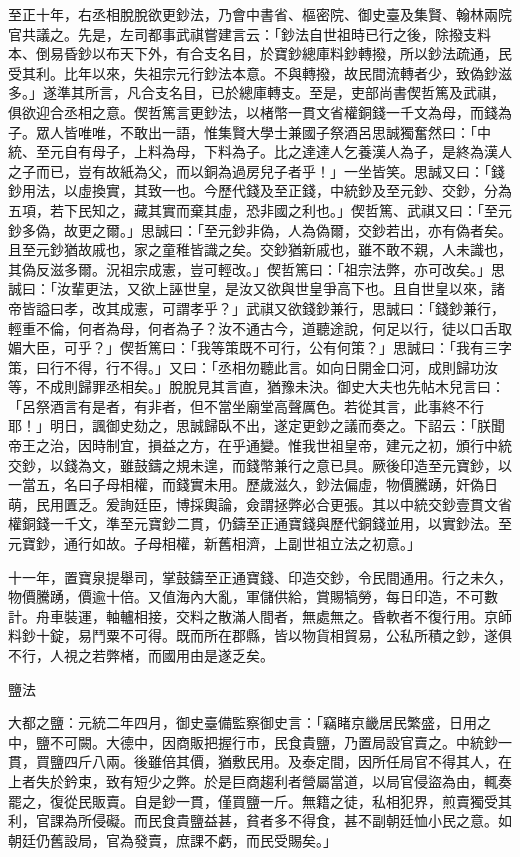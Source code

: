\begin{pinyinscope}
 至正十年，右丞相脫脫欲更鈔法，乃會中書省、樞密院、御史臺及集賢、翰林兩院官共議之。先是，左司都事武祺嘗建言云：「鈔法自世祖時已行之後，除撥支料本、倒易昏鈔以布天下外，有合支名目，於寶鈔總庫料鈔轉撥，所以鈔法疏通，民受其利。比年以來，失祖宗元行鈔法本意。不與轉撥，故民間流轉者少，致偽鈔滋多。」遂準其所言，凡合支名目，已於總庫轉支。至是，吏部尚書偰哲篤及武祺，俱欲迎合丞相之意。偰哲篤言更鈔法，以楮幣一貫文省權銅錢一千文為母，而錢為子。眾人皆唯唯，不敢出一語，惟集賢大學士兼國子祭酒呂思誠獨奮然曰：「中統、至元自有母子，上料為母，下料為子。比之達達人乞養漢人為子，是終為漢人之子而已，豈有故紙為父，而以銅為過房兒子者乎！」一坐皆笑。思誠又曰：「錢鈔用法，以虛換實，其致一也。今歷代錢及至正錢，中統鈔及至元鈔、交鈔，分為五項，若下民知之，藏其實而棄其虛，恐非國之利也。」偰哲篤、武祺又曰：「至元鈔多偽，故更之爾。」思誠曰：「至元鈔非偽，人為偽爾，交鈔若出，亦有偽者矣。且至元鈔猶故戚也，家之童稚皆識之矣。交鈔猶新戚也，雖不敢不親，人未識也，其偽反滋多爾。況祖宗成憲，豈可輕改。」偰哲篤曰：「祖宗法弊，亦可改矣。」思誠曰：「汝輩更法，又欲上誣世皇，是汝又欲與世皇爭高下也。且自世皇以來，諸帝皆謚曰孝，改其成憲，可謂孝乎？」武祺又欲錢鈔兼行，思誠曰：「錢鈔兼行，輕重不倫，何者為母，何者為子？汝不通古今，道聽途說，何足以行，徒以口舌取媚大臣，可乎？」偰哲篤曰：「我等策既不可行，公有何策？」思誠曰：「我有三字策，曰行不得，行不得。」又曰：「丞相勿聽此言。如向日開金口河，成則歸功汝等，不成則歸罪丞相矣。」脫脫見其言直，猶豫未決。御史大夫也先帖木兒言曰：「呂祭酒言有是者，有非者，但不當坐廟堂高聲厲色。若從其言，此事終不行耶！」明日，諷御史劾之，思誠歸臥不出，遂定更鈔之議而奏之。下詔云：「朕聞帝王之治，因時制宜，損益之方，在乎通變。惟我世祖皇帝，建元之初，頒行中統交鈔，以錢為文，雖鼓鑄之規未遑，而錢幣兼行之意已具。厥後印造至元寶鈔，以一當五，名曰子母相權，而錢實未用。歷歲滋久，鈔法偏虛，物價騰踴，奸偽日萌，民用匱乏。爰詢廷臣，博採輿論，僉謂拯弊必合更張。其以中統交鈔壹貫文省權銅錢一千文，準至元寶鈔二貫，仍鑄至正通寶錢與歷代銅錢並用，以實鈔法。至元寶鈔，通行如故。子母相權，新舊相濟，上副世祖立法之初意。」



 十一年，置寶泉提舉司，掌鼓鑄至正通寶錢、印造交鈔，令民間通用。行之未久，物價騰踴，價逾十倍。又值海內大亂，軍儲供給，賞賜犒勞，每日印造，不可數計。舟車裝運，軸轤相接，交料之散滿人間者，無處無之。昏軟者不復行用。京師料鈔十錠，易鬥粟不可得。既而所在郡縣，皆以物貨相貿易，公私所積之鈔，遂俱不行，人視之若弊楮，而國用由是遂乏矣。



 鹽法



 大都之鹽：元統二年四月，御史臺備監察御史言：「竊睹京畿居民繁盛，日用之中，鹽不可闕。大德中，因商販把握行市，民食貴鹽，乃置局設官賣之。中統鈔一貫，買鹽四斤八兩。後雖倍其價，猶敷民用。及泰定間，因所任局官不得其人，在上者失於鈐束，致有短少之弊。於是巨商趨利者營屬當道，以局官侵盜為由，輒奏罷之，復從民販賣。自是鈔一貫，僅買鹽一斤。無籍之徒，私相犯界，煎賣獨受其利，官課為所侵礙。而民食貴鹽益甚，貧者多不得食，甚不副朝廷恤小民之意。如朝廷仍舊設局，官為發賣，庶課不虧，而民受賜矣。」




\end{pinyinscope}

